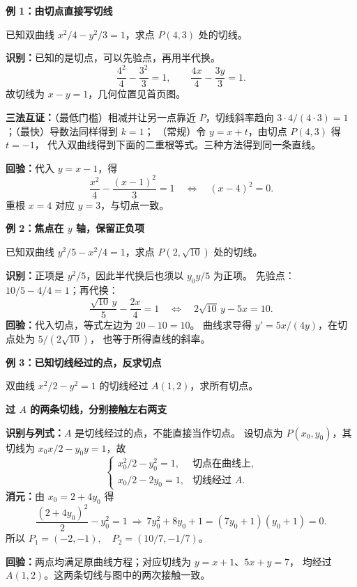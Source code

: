 \clearpage
\begin{examplebox}
\textbf{例 1：由切点直接写切线}

已知双曲线 $x^2/4-y^2/3=1$，求点 $P(4,3)$ 处的切线。

\textbf{识别：}已知的是切点，可以先验点，再用半代换。
\[
\frac{4^2}{4}-\frac{3^2}{3}=1,\qquad
\frac{4x}{4}-\frac{3y}{3}=1.
\]
故切线为 $\boxed{x-y=1}$，几何位置见首页图。

\textbf{三法互证：}（最低门槛）相减并让另一点靠近 $P$，切线斜率趋向
$3\cdot4/(4\cdot3)=1$；（最快）导数法同样得到 $k=1$；
（常规）令 $y=x+t$，由切点 $P(4,3)$ 得 $t=-1$，
代入双曲线得到下面的二重根等式。三种方法得到同一条直线。

\textbf{回验：}代入 $y=x-1$，得
\[
\frac{x^2}{4}-\frac{(x-1)^2}{3}=1
\quad\Longleftrightarrow\quad (x-4)^2=0.
\]
重根 $x=4$ 对应 $y=3$，与切点一致。

\medskip
\textbf{例 2：焦点在 $y$ 轴，保留正负项}

已知双曲线 $y^2/5-x^2/4=1$，求点 $P(2,\sqrt{10})$ 处的切线。

\textbf{识别：}正项是 $y^2/5$，因此半代换后也须以 $y_0y/5$ 为正项。
先验点：$10/5-4/4=1$；再代换：
\[
\frac{\sqrt{10}\,y}{5}-\frac{2x}{4}=1
\quad\Longleftrightarrow\quad
\boxed{2\sqrt{10}\,y-5x=10}.
\]
\textbf{回验：}代入切点，等式左边为 $20-10=10$。
曲线求导得 $y'=5x/(4y)$，在切点处为 $5/(2\sqrt{10})$，
也等于所得直线的斜率。
\end{examplebox}
\clearpage
\begin{examplebox}
\textbf{例 3：已知切线经过的点，反求切点}

双曲线 $x^2/2-y^2=1$ 的切线经过 $A(1,2)$，求所有切点。
\begin{center}
\textbf{过 $A$ 的两条切线，分别接触左右两支}\par\medskip

\end{center}
\textbf{识别与列式：}$A$ 是切线经过的点，不能直接当作切点。
设切点为 $P(x_0,y_0)$，其切线为 $x_0x/2-y_0y=1$，故
\[
\begin{cases}
x_0^2/2-y_0^2=1, & \text{切点在曲线上},\\
x_0/2-2y_0=1, & \text{切线经过 }A.
\end{cases}
\]
\textbf{消元：}由 $x_0=2+4y_0$ 得
\[
\frac{(2+4y_0)^2}{2}-y_0^2=1
\ \Longrightarrow\ 7y_0^2+8y_0+1=(7y_0+1)(y_0+1)=0.
\]
所以 $\boxed{P_1=(-2,-1),\quad P_2=(10/7,-1/7)}$。

\textbf{回验：}两点均满足原曲线方程；对应切线为 $y=x+1$、$5x+y=7$，
均经过 $A(1,2)$。这两条切线与图中的两次接触一致。
\end{examplebox}
